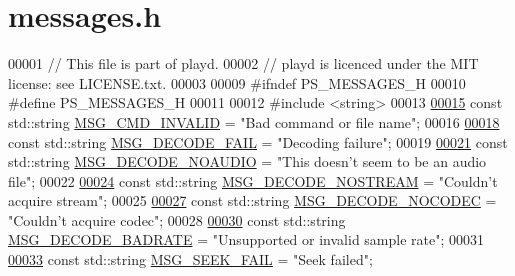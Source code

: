 \hypertarget{messages_8h_source}{\section{messages.\+h}
\label{messages_8h_source}
}

\begin{DoxyCode}
00001 \textcolor{comment}{// This file is part of playd.}
00002 \textcolor{comment}{// playd is licenced under the MIT license: see LICENSE.txt.}
00003 
00009 \textcolor{preprocessor}{#ifndef PS\_MESSAGES\_H}
00010 \textcolor{preprocessor}{#define PS\_MESSAGES\_H}
00011 
00012 \textcolor{preprocessor}{#include <string>}
00013 
\hypertarget{messages_8h_source_l00015}{}\hyperlink{messages_8h_aae611bdef00661caf3dcce93fc2053fe}{00015} \textcolor{keyword}{const} std::string \hyperlink{messages_8h_aae611bdef00661caf3dcce93fc2053fe}{MSG\_CMD\_INVALID} = \textcolor{stringliteral}{"Bad command or file name"};
00016 
\hypertarget{messages_8h_source_l00018}{}\hyperlink{messages_8h_ae2b5d3736c3cf75acf795810753d7481}{00018} \textcolor{keyword}{const} std::string \hyperlink{messages_8h_ae2b5d3736c3cf75acf795810753d7481}{MSG\_DECODE\_FAIL} = \textcolor{stringliteral}{"Decoding failure"};
00019 
\hypertarget{messages_8h_source_l00021}{}\hyperlink{messages_8h_a39968d3057026a86b36b3129b2b5a2de}{00021} \textcolor{keyword}{const} std::string \hyperlink{messages_8h_a39968d3057026a86b36b3129b2b5a2de}{MSG\_DECODE\_NOAUDIO} = \textcolor{stringliteral}{"This doesn't seem to be an audio file"};
00022 
\hypertarget{messages_8h_source_l00024}{}\hyperlink{messages_8h_a968aea854f854a268143c1418ff45a67}{00024} \textcolor{keyword}{const} std::string \hyperlink{messages_8h_a968aea854f854a268143c1418ff45a67}{MSG\_DECODE\_NOSTREAM} = \textcolor{stringliteral}{"Couldn't acquire stream"};
00025 
\hypertarget{messages_8h_source_l00027}{}\hyperlink{messages_8h_a4aac1851da13991427238045f03af981}{00027} \textcolor{keyword}{const} std::string \hyperlink{messages_8h_a4aac1851da13991427238045f03af981}{MSG\_DECODE\_NOCODEC} = \textcolor{stringliteral}{"Couldn't acquire codec"};
00028 
\hypertarget{messages_8h_source_l00030}{}\hyperlink{messages_8h_a6d4302117e822520f5c61b6d40085c4d}{00030} \textcolor{keyword}{const} std::string \hyperlink{messages_8h_a6d4302117e822520f5c61b6d40085c4d}{MSG\_DECODE\_BADRATE} = \textcolor{stringliteral}{"Unsupported or invalid sample rate"};
00031 
\hypertarget{messages_8h_source_l00033}{}\hyperlink{messages_8h_aed3c894dfba47c4007dc39b38b5d3dbe}{00033} \textcolor{keyword}{const} std::string \hyperlink{messages_8h_aed3c894dfba47c4007dc39b38b5d3dbe}{MSG\_SEEK\_FAIL} = \textcolor{stringliteral}{"Seek failed"};

\end{DoxyCode}
